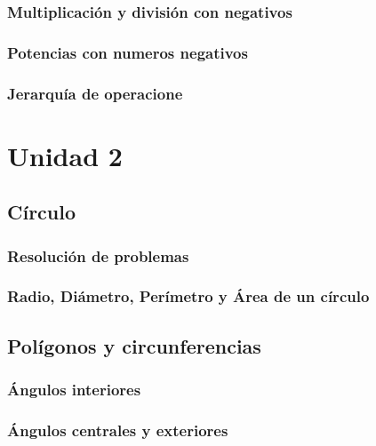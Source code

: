 \documentclass[12pt,addpoints]{evalua3}
\begin{document}
\begin{questions}
	\subsubsection{Multiplicación y división con negativos}
	\question{}
	\subsubsection{Potencias con numeros negativos}
	\question{}
	\subsubsection{Jerarquía de operacione}
	\question{}

	\section{Unidad 2}
	\subsection   {Círculo}
	\subsubsection{Resolución de problemas}
	\question{}
	\subsubsection{Radio, Diámetro, Perímetro y Área de un círculo}
	\question{}
	\subsection   {Polígonos y circunferencias}
	\subsubsection{Ángulos interiores}
	\question{}
	\subsubsection{Ángulos centrales y exteriores}
	\question{}

\end{questions}
\end{document}
